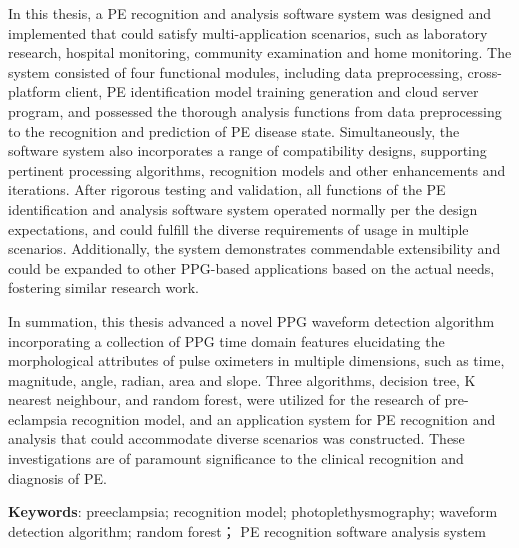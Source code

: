 In this thesis, a PE recognition and analysis software system was designed and implemented that could satisfy multi-application scenarios, 
such as laboratory research, hospital monitoring, community examination and home monitoring.
The system consisted of four functional modules, including data preprocessing, cross-platform client, 
PE identification model training generation and cloud server program, 
and possessed the thorough analysis functions from data preprocessing to the recognition and prediction of PE disease state.
Simultaneously, the software system also incorporates a range of compatibility designs, supporting pertinent processing algorithms, 
recognition models and other enhancements and iterations.
After rigorous testing and validation, all functions of the PE identification and analysis software system operated normally per the design expectations, 
and could fulfill the diverse requirements of usage in multiple scenarios.
Additionally, the system demonstrates commendable extensibility and could be expanded to other PPG-based applications based on the actual needs, 
fostering similar research work.

In summation, this thesis advanced a novel PPG waveform detection algorithm incorporating a collection of PPG
time domain features elucidating the morphological attributes of pulse oximeters in multiple dimensions,
such as time, magnitude, angle, radian, area and slope.
Three algorithms, decision tree, K nearest neighbour, and random forest, were utilized for 
the research of pre-eclampsia recognition model, and an application system for PE recognition and analysis 
that could accommodate diverse scenarios was constructed.
These investigations are of paramount significance to the clinical recognition and diagnosis of PE.


\vspace{2em}

\textbf{Keywords}: preeclampsia; recognition model; photoplethysmography; waveform detection algorithm; random forest；
PE recognition software analysis system